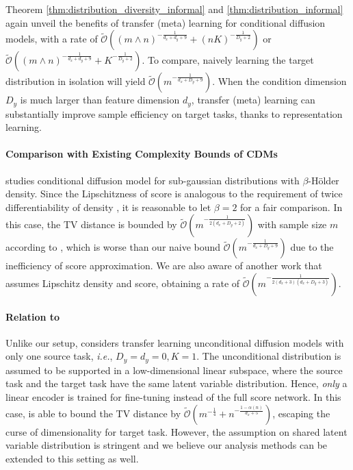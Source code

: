 \documentclass[11pt]{article}
\numberwithin{equation}{section}
\begin{document}
Theorem \ref{thm:distribution_diversity_informal} and \ref{thm:distribution_informal} again unveil the benefits of transfer (meta) learning for conditional diffusion models, with a rate of $\widetilde{\mathcal{O}}((m\wedge n)^{-\frac{1}{d_x+d_y+9}}+(nK)^{-\frac{1}{D_y+2}})$ or $\widetilde{\mathcal{O}}((m\wedge n)^{-\frac{1}{d_x+d_y+9}}+K^{-\frac{1}{D_y+2}})$.
To compare, naively learning the target distribution in isolation will yield $\widetilde{\mathcal{O}}(m^{-\frac{1}{d_x+D_y+9}})$.
When the condition dimension $D_y$ is much larger than feature dimension $d_y$, transfer (meta) learning can substantially improve sample efficiency on target tasks, thanks to representation learning.

\paragraph{Comparison with Existing Complexity Bounds of CDMs}

\citet{fu2024unveil} studies conditional diffusion model for sub-gaussian distributions with $\beta$-H\"older density.
Since the Lipschitzness of score is analogous to the requirement of twice differentiability of density \citep{wibisono2024optimal}, it is reasonable to let $\beta=2$ for a fair comparison.
In this case, the TV distance is bounded by $\widetilde{\mathcal{O}}(m^{-\frac{1}{2(d_x+D_y+2)}})$ with sample size $m$ according to \citet{fu2024unveil}, which is worse than our naive bound $\widetilde{\mathcal{O}}(m^{-\frac{1}{d_x+D_y+9}})$ due to the inefficiency of score approximation.
We are also aware of another work \citep{jiao2024model} that assumes Lipschitz density and score, obtaining a rate of $\widetilde{\mathcal{O}}(m^{-\frac{1}{2(d_x+3)(d_x+D_y+3)}})$.

\paragraph{Relation to \citet{yang2024fewshot}}

Unlike our setup, \citet{yang2024fewshot} considers transfer learning unconditional diffusion models with only one source task, \textit{i.e.}, $D_y=d_y=0,K=1$.
The unconditional distribution is assumed to be supported in a low-dimensional linear subspace, where the source task and the target task have the same latent variable distribution. 
Hence, \textit{only} a linear encoder is trained for fine-tuning instead of the full score network. 
In this case, \citet{yang2024fewshot} is able to bound the TV distance by $\widetilde{\mathcal{O}}(m^{-\frac{1}{4}}+n^{-\frac{1-\alpha(n)}{d_x+5}})$, escaping the curse of dimensionality for target task.
However, the assumption on shared latent variable distribution is stringent and we believe our analysis methods can be extended to this setting as well.
\end{document}
